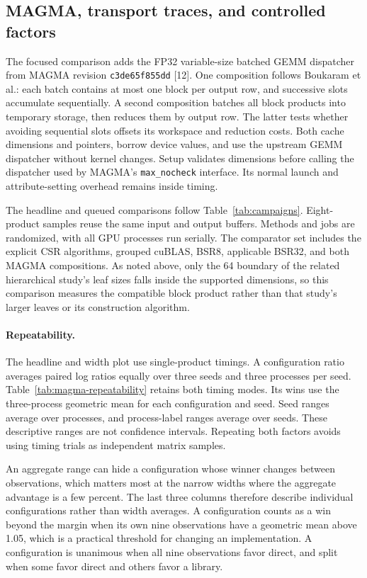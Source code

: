 \subsection{MAGMA, transport traces, and controlled factors}\label{sec:relevance}
The focused comparison adds the FP32 variable-size batched GEMM dispatcher
from MAGMA revision \texttt{c3de65f855dd} [12]. One composition follows
Boukaram et al.: each batch contains at most one block per output row,
and successive slots accumulate sequentially. A second composition batches
all block products into temporary storage, then reduces them by output row.
The latter tests whether avoiding sequential slots offsets its workspace
and reduction costs. Both cache dimensions and pointers, borrow device
values, and use the upstream GEMM dispatcher without kernel changes.
Setup validates dimensions before calling the dispatcher used by MAGMA's
\texttt{max\_nocheck} interface. Its normal launch and attribute-setting
overhead remains inside timing.

The headline and queued comparisons follow Table~\ref{tab:campaigns}.
Eight-product samples reuse the same input and output buffers.
Methods and jobs are randomized, with all GPU processes run serially.
The comparator set includes the explicit CSR algorithms, grouped cuBLAS,
BSR8, applicable BSR32, and both MAGMA compositions. As noted above, only the 64 boundary
of the related hierarchical study's leaf sizes falls inside the supported
dimensions, so this comparison measures the compatible block product rather
than that study's larger leaves or its construction algorithm.

\paragraph{Repeatability.}
The headline and width plot use single-product timings. A configuration ratio
averages paired log ratios equally over three seeds and three processes per
seed. Table~\ref{tab:magma-repeatability} retains both timing modes. Its wins
use the three-process geometric mean for each configuration and seed.
Seed ranges average over processes, and process-label ranges average over
seeds. These descriptive ranges are not confidence intervals. Repeating both
factors avoids using timing trials as independent matrix samples.

An aggregate range can hide a configuration whose winner changes between
observations, which matters most at the narrow widths where the aggregate
advantage is a few percent. The last three columns therefore describe
individual configurations rather than width averages. A configuration counts
as a win beyond the margin when its own nine observations have a geometric
mean above 1.05, which is a practical threshold for changing an
implementation. A configuration is unanimous when all nine observations favor
direct, and split when some favor direct and others favor a library.

